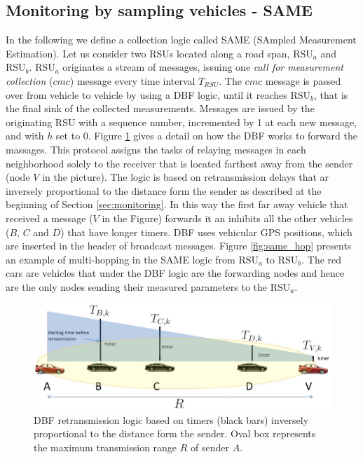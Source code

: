 \documentclass[conference]{IEEEtran}
\begin{document}
\subsection{Monitoring by sampling vehicles - SAME}
\label{subsec:DBFsampled}
In the following we define a collection logic called SAME (SAmpled Measurement Estimation).
Let us consider two RSUs located along a road span, $\text{RSU}_a$ and $\text{RSU}_b$. $\text{RSU}_a$ originates a stream of messages, issuing one \emph{call for measurement collection} ($cmc$) message every time interval $T_{RSU}$. The $cmc$ message is passed over from vehicle to vehicle by using a DBF logic, until it reaches $\text{RSU}_b$, that is the final sink of the collected measurements. Messages are issued by the originating RSU with a sequence number, incremented by 1 at each new message, and with $h$ set to 0.
Figure \ref{fig:same} gives a detail on how the DBF works to forward the massages. This protocol assigns the tasks of relaying messages in each neighborhood solely to
the receiver that is located farthest away from the sender (node $V$ in the picture). The logic is based on retransmission delays that ar inversely proportional to the distance form the sender as described at the beginning of Section \ref{sec:monitoring}. In this way the first far away vehicle that received a message ($V$ in the Figure) forwards it an inhibits all the other vehicles ($B$, $C$ and $D$) that have longer timers.
DBF uses vehicular GPS positions, which are inserted in the
header of broadcast messages.
Figure \ref{fig:same_hop} presents an example of multi-hopping in the SAME logic from $\text{RSU}_a$ to $\text{RSU}_b$. The red cars are vehicles that under the DBF logic are the forwarding nodes and hence are the only nodes sending their measured parameters to the $\text{RSU}_a$.

\begin{figure}[tbhp]
\begin{center}
\includegraphics[width=0.8\columnwidth]{fig/SAME.eps}
\caption{DBF retransmission logic based on timers (black bars) inversely proportional to the distance form the sender. Oval box represents the maximum transmission range $R$ of sender $A$.}
\label{fig:same}
\end{center}
\end{figure}
\end{document}
